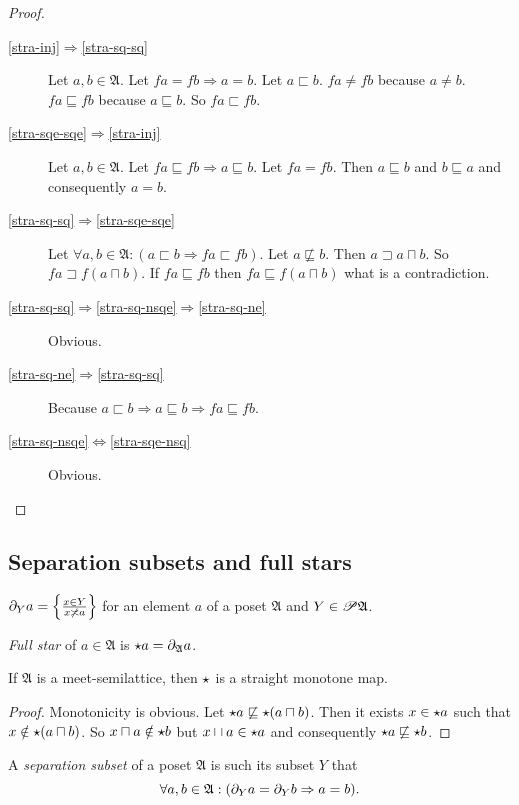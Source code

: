 \begin{proof}
~
\begin{description}
\item [{\ref{stra-inj}$\Rightarrow$\ref{stra-sq-sq}}] Let $a,b\in\mathfrak{A}$.
Let $fa=fb\Rightarrow a=b$. Let $a\sqsubset b$. $fa\neq fb$ because
$a\neq b$. $fa\sqsubseteq fb$ because $a\sqsubseteq b$. So $fa\sqsubset fb$.
\item [{\ref{stra-sqe-sqe}$\Rightarrow$\ref{stra-inj}}] Let $a,b\in\mathfrak{A}$.
Let $fa\sqsubseteq fb\Rightarrow a\sqsubseteq b$. Let $fa=fb$. Then
$a\sqsubseteq b$ and $b\sqsubseteq a$ and consequently $a=b$.
\item [{\ref{stra-sq-sq}$\Rightarrow$\ref{stra-sqe-sqe}}] Let $\forall a,b\in\mathfrak{A}:(a\sqsubset b\Rightarrow fa\sqsubset fb)$.
Let $a\nsqsubseteq b$. Then $a\sqsupset a\sqcap b$. So $fa\sqsupset f(a\sqcap b)$.
If $fa\sqsubseteq fb$ then $fa\sqsubseteq f(a\sqcap b)$ what is
a contradiction.
\item [{\ref{stra-sq-sq}$\Rightarrow$\ref{stra-sq-nsqe}$\Rightarrow$\ref{stra-sq-ne}}] Obvious.
\item [{\ref{stra-sq-ne}$\Rightarrow$\ref{stra-sq-sq}}] Because $a\sqsubset b\Rightarrow a\sqsubseteq b\Rightarrow fa\sqsubseteq fb$.
\item [{\ref{stra-sq-nsqe}$\Leftrightarrow$\ref{stra-sqe-nsq}}] Obvious.
\end{description}
\end{proof}

\subsection{\label{sep-and-full}Separation subsets and full stars}
\begin{defn}
$\partial_{Y}a=\left\{ \frac{x\in Y}{x\not\asymp a}\right\}$ for an element $a$
of a poset $\mathfrak{A}$ and $Y\in\mathscr{P}\mathfrak{A}$.
\end{defn}

\begin{defn}
\emph{Full star} of $a\in\mathfrak{A}$ is $\star a=\partial_{\mathfrak{A}}a$.\end{defn}
\begin{prop}
If $\mathfrak{A}$ is a meet-semilattice, then $\star$ is a straight
monotone map.\end{prop}
\begin{proof}
Monotonicity is obvious. Let $\star a\not\sqsubseteq\star(a\sqcap b)$.
Then it exists $x\in\star a$ such that $x\notin\star(a\sqcap b)$.
So $x\sqcap a\notin\star b$ but $x\sqcap a\in\star a$ and
consequently $\star a\not\sqsubseteq\star b$.\end{proof}
\begin{defn}
A \emph{separation subset} of a poset $\mathfrak{A}$
is such its subset $Y$ that
\[
\forall a,b\in\mathfrak{A}:(\partial_{Y}a=\partial_{Y}b\Rightarrow a=b).
\]

\end{defn}

